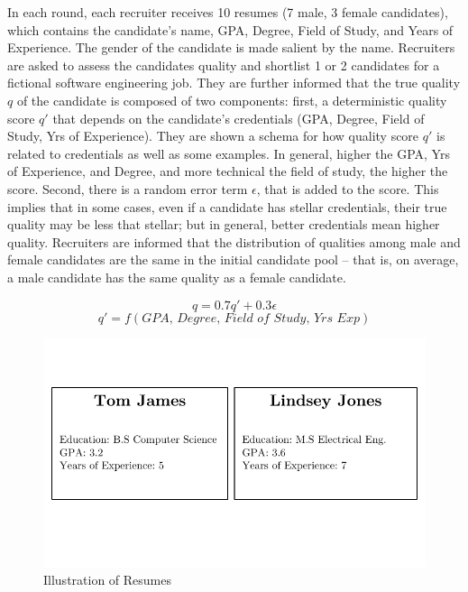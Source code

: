 \documentclass[11pt]{article}
\begin{document}
In each round, each recruiter receives 10 resumes (7 male, 3 female candidates)\footnotemark, which contains the candidate's name, GPA, Degree, Field of Study, and Years of Experience. The gender of the candidate is made salient by the name. Recruiters are asked to assess the candidates quality and shortlist 1 or 2 candidates for a fictional software engineering job. They are further informed that the true quality $q$ of the candidate is composed of two components: first, a deterministic quality score $q'$ that depends on the candidate's credentials (GPA, Degree, Field of Study, Yrs of Experience). They are shown a schema for how quality score $q'$ is related to credentials as well as some examples. In general, higher the GPA, Yrs of Experience, and Degree, and more technical the field of study, the higher the score. Second, there is a random error term $\epsilon$, that is added to the score. This implies that in some cases, even if a candidate has stellar credentials, their true quality may be less that stellar; but in general, better credentials mean higher quality. Recruiters are informed that the distribution of qualities among male and female candidates are the same in the initial candidate pool -- that is, on average, a male candidate has the same quality as a female candidate.


$$q = 0.7q' + 0.3\epsilon$$
$$q' = f(\textit{GPA, Degree, Field of Study, Yrs Exp})$$



\begin{figure} %
    \centering
    \includegraphics[width=\textwidth, keepaspectratio]{illus/resumes.pdf}
    \caption{Illustration of Resumes}
    \label{sample_resumes}
\end{figure}
\end{document}
